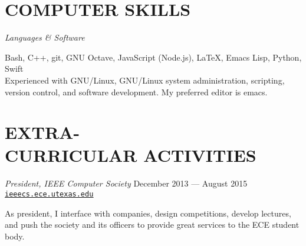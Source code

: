 \documentclass[margin]{res}
\begin{document}
\begin{resume}
  \section{COMPUTER SKILLS}
  {\sl Languages \& Software} \\
  \vspace{-1.0em}
  \begin{adjustwidth}{1.5em}{0pt}
    Bash, C++, git, GNU Octave, JavaScript (Node.js), \LaTeX, Emacs Lisp,
    Python, Swift
    \vspace{.5em}\\
    Experienced with GNU/Linux, GNU/Linux system administration, scripting,
    version control, and software development. My preferred editor is emacs.
  \end{adjustwidth}

  \section{EXTRA-\\CURRICULAR ACTIVITIES}
  {\sl President, IEEE Computer Society}
  \hfill December 2013 --- August 2015 \\
  \href{http://ieeecs.ece.utexas.edu}{\ul{\texttt{ieeecs.ece.utexas.edu}}}
  \begin{adjustwidth}{1.5em}{0pt}
    As president, I interface with companies, design competitions, develop
    lectures, and push the society and its officers to provide great services to
    the ECE student body.
   \end{adjustwidth}
\end{resume}
\end{document}
